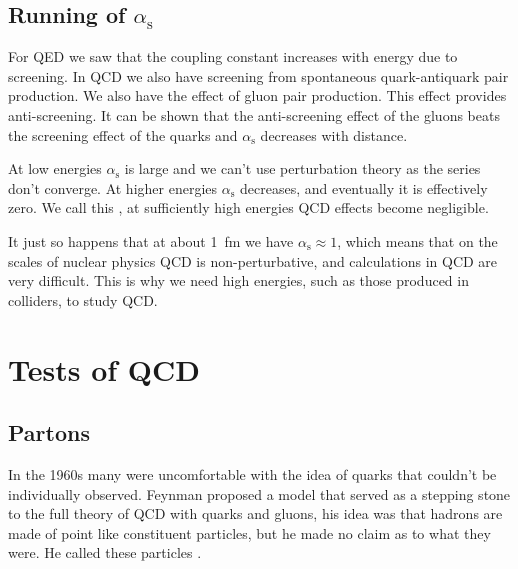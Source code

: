 \documentclass[fleqn]{NotesClass}
\newcommand*{\strong}{\mathrm{s}}
\begin{document}
    \section{Running of \(\alpha_{\strong}\)}
    For QED we saw that the coupling constant increases with energy due to screening.
    In QCD we also have screening from spontaneous quark-antiquark pair production.
    We also have the effect of gluon pair production.
    This effect provides anti-screening.
    It can be shown that the anti-screening effect of the gluons beats the screening effect of the quarks and \(\alpha_{\strong}\) decreases with distance.
    
    At low energies \(\alpha_{\strong}\) is large and we can't use perturbation theory as the series don't converge.
    At higher energies \(\alpha_{\strong}\) decreases, and eventually it is effectively zero.
    We call this , at sufficiently high energies QCD effects become negligible.
    
    It just so happens that at about \qty{1}{\femto\metre} we have \(\alpha_{\strong} \approx 1\), which means that on the scales of nuclear physics QCD is non-perturbative, and calculations in QCD are very difficult.
    This is why we need high energies, such as those produced in colliders, to study QCD.
    
    \chapter{Tests of QCD}
    \section{Partons}
    In the 1960s many were uncomfortable with the idea of quarks that couldn't be individually observed.
    Feynman proposed a model that served as a stepping stone to the full theory of QCD with quarks and gluons, his idea was that hadrons are made of point like constituent particles, but he made no claim as to what they were.
    He called these particles .
    
\end{document}
